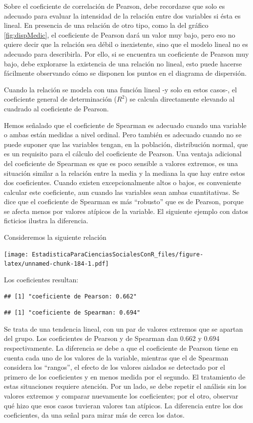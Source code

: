 \documentclass[]{book}
\begin{document}
Sobre el coeficiente de correlación de Pearson, debe recordarse que solo
es adecuado para evaluar la intensidad de la relación entre dos
variables si ésta es lineal. En presencia de una relación de otro tipo,
como la del gráfico \ref{fig:dispMedic}, el coeficiente de Pearson dará un valor muy bajo,
pero eso no quiere decir que la relación sea débil o inexistente, sino
que el modelo lineal no es adecuado para describirla. Por ello, si se
encuentra un coeficiente de Pearson muy bajo, debe explorarse la
existencia de una relación no lineal, esto puede hacerse fácilmente
observando cómo se disponen los puntos en el diagrama de dispersión.

Cuando la relación se modela con una función lineal -y solo en estos
casos-, el coeficiente general de determinación (\(R^2\)) se calcula
directamente elevando al cuadrado al coeficiente de Pearson.

Hemos señalado que el coeficiente de Spearman es adecuado cuando una
variable o ambas están medidas a nivel ordinal. Pero también es adecuado
cuando no se puede suponer que las variables tengan, en la población,
distribución normal, que es un requisito para el cálculo del coeficiente
de Pearson. Una ventaja adicional del coeficiente de Spearman es que es
poco sensible a valores extremos, es una situación similar a la relación
entre la media y la mediana la que hay entre estos dos coeficientes.
Cuando existen excepcionalmente altos o bajos, es conveniente calcular este coeficiente, aun cuando las variables sean ambas cuantitativas. Se
dice que el coeficiente de Spearman es más ``robusto'' que es de Pearson,
porque se afecta menos por valores atípicos de la variable. El siguiente ejemplo con datos ficticios ilustra la diferencia.

Consideremos la siguiente relación

\texttt{[image: EstadisticaParaCienciasSocialesConR\_files/figure-latex/unnamed-chunk-184-1.pdf]}

Los coeficientes resultan:

\begin{verbatim}
## [1] "coeficiente de Pearson: 0.662"
\end{verbatim}

\begin{verbatim}
## [1] "coeficiente de Spearman: 0.694"
\end{verbatim}

Se trata de una tendencia lineal, con un par de valores extremos que se apartan del
grupo. Los coeficientes de Pearson y de Spearman dan 0.662 y 0.694 respectivamente. La diferencia se debe a que el coeficiente de Pearson tiene en cuenta cada uno de los valores de la variable, mientras que el de Spearman considera los ``rangos'', el efecto de los valores aislados se detectado por el primero de los coeficientes y en menos medida por el segundo. El
tratamiento de estas situaciones requiere atención. Por un lado, se debe
repetir el análisis sin los valores extremos y comparar nuevamente los
coeficientes; por el otro, observar qué hizo que esos casos tuvieran valores tan atípicos. La diferencia entre los dos coeficientes, da una
señal para mirar más de cerca los datos.
\end{document}
